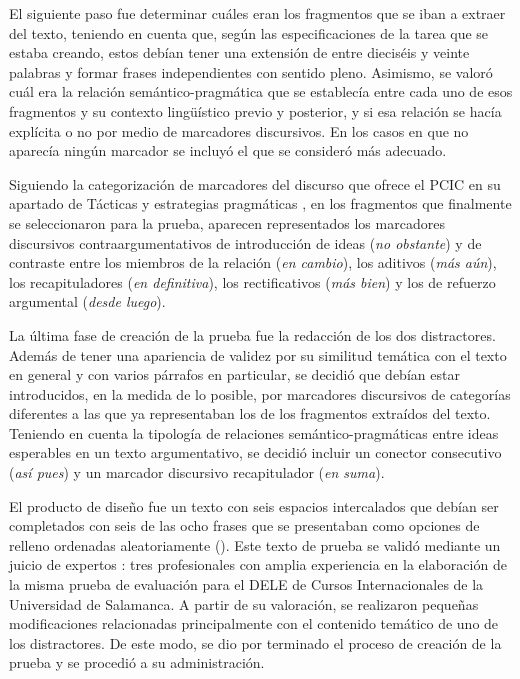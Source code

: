 \documentclass[spanish]{textolivre}
\begin{document}
El siguiente paso fue determinar cuáles eran los fragmentos que se iban a extraer del texto, teniendo en cuenta que, según las especificaciones de la tarea que se estaba creando, estos debían tener una extensión de entre dieciséis y veinte palabras y formar frases independientes con sentido pleno. Asimismo, se valoró cuál era la relación semántico-pragmática que se establecía entre cada uno de esos fragmentos y su contexto lingüístico previo y posterior, y si esa relación se hacía explícita o no por medio de marcadores discursivos. En los casos en que no aparecía ningún marcador se incluyó el que se consideró más adecuado.

Siguiendo la categorización de marcadores del discurso que ofrece el PCIC en su apartado de Tácticas y estrategias pragmáticas \cite{instituto2006}, en los fragmentos que finalmente se seleccionaron para la prueba, aparecen representados los marcadores discursivos contraargumentativos de introducción de ideas (\emph{no obstante}) y de contraste entre los miembros de la relación (\emph{en cambio}), los aditivos (\emph{más aún}), los recapituladores (\emph{en definitiva}), los rectificativos (\emph{más bien}) y los de refuerzo argumental (\emph{desde luego}).

La última fase de creación de la prueba fue la redacción de los dos distractores. Además de tener una apariencia de validez por su similitud temática con el texto en general y con varios párrafos en particular, se decidió que debían estar introducidos, en la medida de lo posible, por marcadores discursivos de categorías diferentes a las que ya representaban los de los fragmentos extraídos del texto. Teniendo en cuenta la tipología de relaciones semántico-pragmáticas entre ideas esperables en un texto argumentativo, se decidió incluir un conector consecutivo (\emph{así pues}) y un marcador discursivo recapitulador (\emph{en suma}).

El producto de diseño fue un texto con seis espacios intercalados que debían ser completados con seis de las ocho frases que se presentaban como opciones de relleno ordenadas aleatoriamente (). Este texto de prueba se validó mediante un juicio de expertos \cite{escobar2008validez}: tres profesionales con amplia experiencia en la elaboración de la misma prueba de evaluación para el DELE de Cursos Internacionales de la Universidad de Salamanca. A partir de su valoración, se realizaron pequeñas modificaciones relacionadas principalmente con el contenido temático de uno de los distractores. De este modo, se dio por terminado el proceso de creación de la prueba y se procedió a su administración.
\end{document}
